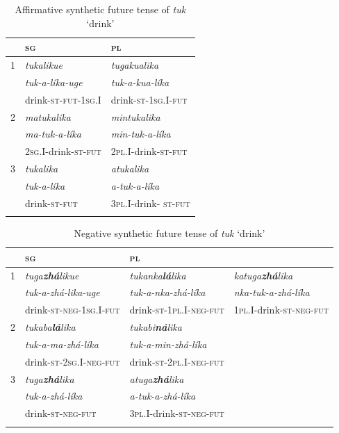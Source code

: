 \documentclass[output=paper,colorlinks,citecolor=brown]{langscibook}
\begin{document}
\begin{table}
\begin{tabularx}{.6\textwidth}{lll}
    \lsptoprule
        & {\scshape sg}                  & {\scshape pl}\\
    \midrule
    {1} & {\itshape tukalikue}           & {\itshape tugakualika} \\
        & {\itshape tuk-a-líka-uge}      & {\textit{tuk-a-kua{}-líka}} \\
        & {drink-\textsc{st-fut-1sg.I}}  & {drink-\textsc{st-1sg.I-fut}}\\
    \midrule
    {2} & {\itshape matukalika}                  & {\itshape mintukalika} \\
        & {\textit{ma{}-tuk-a-líka}}             & {\textit{min{}-tuk-a-líka}} \\
        & {\textsc{2sg.I-}drink-\textsc{st-fut}} & {\textsc{2pl.I{}-}drink-\textsc{st-fut}}\\
    \midrule
    {3} & {\itshape tukalika}         & {\itshape atukalika} \\
        & {\itshape tuk-a-líka}       & {\itshape a-tuk-a-líka} \\
        & {drink-\textsc{st-fut}}     & {\textsc{3pl.I{}-}drink- \textsc{st-fut}} \\
    \lspbottomrule
\end{tabularx}
\caption{Affirmative synthetic future tense of \textit{tuk} ‘drink’}
\label{tab:kog:1}
\end{table}

\begin{table}\small 
\begin{tabularx}{\textwidth}{lXXX} 
    \lsptoprule
    & {\scshape sg} & {\scshape pl} & \\
    \midrule 
    {1} & \textit{tuga\textbf{zhá}likue}    & \textit{tukanka\textbf{lá}lika}   & \textit{katuga\textbf{zhá}lika}\\
        & \textit{tuk-a-zhá-lika-uge}       & \textit{tuk-a-nka-zhá-l\'{i}ka}   & \textit{nka-tuk-a-zhá-l\'{i}ka}\\
        & drink-\textsc{st-neg-1sg.I-fut}   & {drink-\textsc{st-1pl.I-neg-fut}} & \textsc{1pl.I-}drink-\textsc{st-neg-fut}\\
    \midrule
    {2} & \textit{tukaba\textbf{lá}lika}    & \textit{tukabi\textbf{ná}lika}    & \\
        & \textit{tuk-a-ma-zhá-l\'{i}ka}    & \textit{tuk-a-min-zhá-l\'{i}ka}   & \\
        & drink-\textsc{st-2sg.I-neg-fut}   & drink-\textsc{st-2pl.I-neg-fut}   & \\
    \midrule
    {3} & \textit{tuga\textbf{zhá}lika}     & \textit{atuga\textbf{zhá}lika}    & \\
        & \textit{tuk-a-zhá-líka}           & \textit{a-tuk-a-zhá-líka}         & \\
        & drink-\textsc{st-neg-fut}         & \textsc{3pl.I-}drink-\textsc{st-neg-fut} & \\
    \lspbottomrule
\end{tabularx}
\caption{Negative synthetic future tense of \textit{tuk} ‘drink’}
\label{tab:kog:2}
\end{table}
\end{document}
